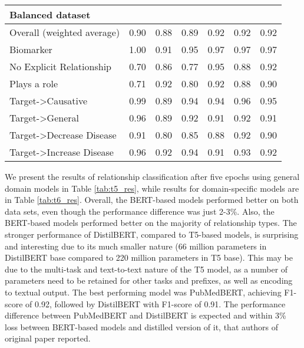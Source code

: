 \documentclass[final,12pt,3p,times,twocolumn,authoryear]{elsarticle}
\begin{document}
\begin{table*}[!t]
\begin{tabular}{|l|l|l|l|l|l|l|}
         \multicolumn{7}{|l|}{Balanced dataset}  \\  \hline  
       Overall (weighted average)  &  0.90 & 0.88 & 0.89 & 0.92 & 0.92 & 0.92\\
        \hspace*{3mm} Biomarker & 1.00   &   0.91   &   0.95 & 0.97 & 0.97 & 0.97 \\
        \hspace*{3mm} No Explicit Relationship   & 0.70  &   0.86 &    0.77 & 0.95 & 0.88 & 0.92 \\
        \hspace*{3mm} Plays a role &  0.71   & 0.92 &   0.80 & 0.92 & 0.88 & 0.90\\ 
        \hspace*{3mm} Target-\textgreater Causative  & 0.99 &    0.89 &     0.94 & 0.94 & 0.96 & 0.95\\
        \hspace*{3mm} Target-\textgreater General        & 0.96   & 0.89 &    0.92 & 0.91 & 0.92 & 0.91\\
        \hspace*{3mm} Target-\textgreater  Decrease Disease & 0.91 &    0.80  & 0.85  & 0.88 & 0.92 & 0.90 \\
        \hspace*{3mm} Target-\textgreater  Increase Disease   &  0.96  &   0.92   &  0.94 & 0.91 & 0.93 & 0.92 \\ 
        \hline
        
    \end{tabular}
    \caption{Results of the best performing fine-tuned SciFive and PubMedBERT models (after 5 epochs)}
    \label{tab:t6_res}
\end{table*}  

We present the results of relationship classification after five epochs using general domain models in Table \ref{tab:t5_res}, while results for domain-specific models are in Table \ref{tab:t6_res}. Overall, the BERT-based models performed better on both data sets, even though the performance difference was just 2-3\%. Also, the BERT-based models performed better on the majority of relationship types. The stronger performance of DistilBERT, compared to T5-based models, is surprising and interesting due to its much smaller nature (66 million parameters in DistilBERT base compared to 220 million parameters in T5 base). This may be due to the multi-task and text-to-text nature of the T5 model, as a number of parameters need to be retained for other tasks and prefixes, as well as encoding to textual output. The best performing model was PubMedBERT, achieving F1-score of 0.92, followed by DistilBERT with F1-score of 0.91. The performance difference between PubMedBERT and DistilBERT is expected and within 3\% loss between BERT-based models and distilled version of it, that authors of original paper reported.  
\end{document}
